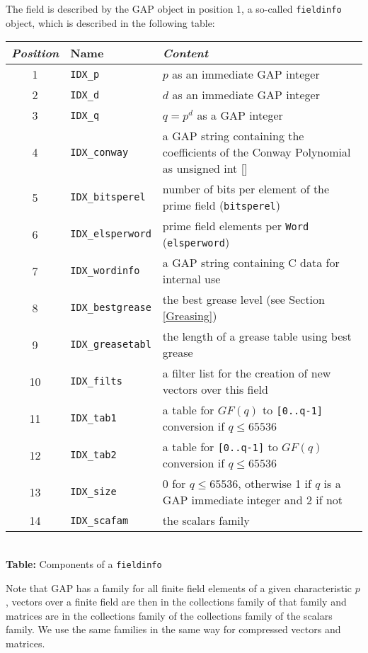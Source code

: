 \documentclass[a4paper,11pt]{report}
\begin{document}
{{{ The field is described by the \textsf{GAP} object in position 1, a so-called \texttt{fieldinfo} object, which is described in the following table: \begin{center}
\begin{tabular}{cll}\emph{Position}&
Name&
\emph{Content}\\
\hline
1&
\texttt{IDX\_p} &
$p$ as an immediate \textsf{GAP} integer\\
2&
\texttt{IDX\_d} &
$d$ as an immediate \textsf{GAP} integer\\
3&
\texttt{IDX\_q} &
$q=p^d$ as a \textsf{GAP} integer\\
4&
\texttt{IDX\_conway} &
a \textsf{GAP} string containing the coefficients of the Conway Polynomial as unsigned int []\\
5&
\texttt{IDX\_bitsperel} &
number of bits per element of the prime field (\texttt{bitsperel})\\
6&
\texttt{IDX\_elsperword} &
prime field elements per \texttt{Word} (\texttt{elsperword})\\
7&
\texttt{IDX\_wordinfo} &
a \textsf{GAP} string containing C data for internal use\\
8&
\texttt{IDX\_bestgrease} &
the best grease level (see Section \ref{Greasing})\\
9&
\texttt{IDX\_greasetabl} &
the length of a grease table using best grease\\
10&
\texttt{IDX\_filts} &
a filter list for the creation of new vectors over this field\\
11&
\texttt{IDX\_tab1} &
a table for $GF(q)$ to \texttt{[0..q-1]} conversion if $q \leq 65536$\\
12&
\texttt{IDX\_tab2} &
a table for \texttt{[0..q-1]} to $GF(q)$ conversion if $q \leq 65536$\\
13&
\texttt{IDX\_size} &
0 for $q \leq 65536$, otherwise 1 if $q$ is a \textsf{GAP} immediate integer and 2 if not\\
14&
\texttt{IDX\_scafam} &
the scalars family\\
\end{tabular}\\[2mm]
\textbf{Table: }Components of a \texttt{fieldinfo}\end{center}

 Note that \textsf{GAP} has a family for all finite field elements of a given characteristic $p$, vectors over a finite field are then in the collections family of that
family and matrices are in the collections family of the collections family of
the scalars family. We use the same families in the same way for compressed
vectors and matrices. }

}}
\end{document}
